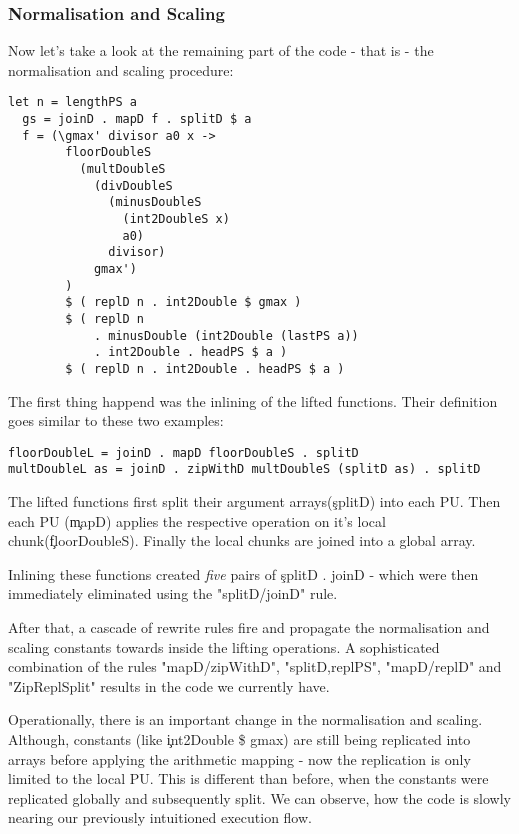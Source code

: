     \subsubsection{Normalisation and Scaling}
    
    Now let's take a look at the remaining part of the code - that is - the
    normalisation and scaling procedure:
    
    \begin{lstlisting}
let n = lengthPS a
  gs = joinD . mapD f . splitD $ a
  f = (\gmax' divisor a0 x ->
        floorDoubleS
          (multDoubleS
            (divDoubleS
              (minusDoubleS
                (int2DoubleS x)
                a0)
              divisor)
            gmax')
        )
        $ ( replD n . int2Double $ gmax )
        $ ( replD n
            . minusDouble (int2Double (lastPS a))
            . int2Double . headPS $ a )
        $ ( replD n . int2Double . headPS $ a )
    \end{lstlisting}
    The first thing happend was the inlining of the lifted functions. Their definition goes similar to these two examples:
    \begin{lstlisting}
floorDoubleL = joinD . mapD floorDoubleS . splitD
multDoubleL as = joinD . zipWithD multDoubleS (splitD as) . splitD
    \end{lstlisting}
    The lifted functions first split their argument arrays(\c{splitD}) into each PU.
    Then each PU (\c{mapD}) applies the respective operation on it's local chunk(\c{floorDoubleS}).
    Finally the local chunks are joined into a global array.
    
    Inlining these functions created \emph{five} pairs of \c{splitD . joinD} - which were then immediately
    eliminated using the "splitD/joinD" rule.
    
    After that, a cascade of rewrite rules fire and propagate the normalisation and scaling
    constants towards inside the lifting operations. A sophisticated combination of the rules
    "mapD/zipWithD", "splitD,replPS", "mapD/replD" and "ZipReplSplit" results in
    the code we currently have.
    
    Operationally, there is an important change in the normalisation and scaling.
    Although, constants (like \c{int2Double \$ gmax}) are still being replicated into arrays
    before applying the arithmetic mapping - now the replication
    is only limited to the local PU. This is different than before, when
    the constants were replicated globally and subsequently split.
    We can observe, how the code is slowly nearing our previously intuitioned execution flow.
    
